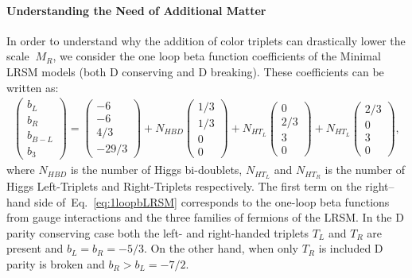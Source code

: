 \documentclass[11pt]{article}
\newcommand{\MR}{\:M_{R}}
\newcommand{\eq}[1]{Eq.~\eqref{#1}}
\def\bea{\begin{eqnarray} }
\def\eea{ \end{eqnarray} }
\begin{document}
\paragraph{Understanding the Need of Additional Matter}
In order to understand why the addition of color triplets can drastically lower the scale $\MR$, we consider the one loop beta function coefficients of the Minimal LRSM models (both D conserving and D breaking). These coefficients can be written as:
%
\bea
\label{eq:1loopbLRSM}
\left(
\begin{array}{c}
b_L\\
b_R\\
b_{B-L}\\
b_3
\end{array}\right)= 
\left(
\begin{array}{c}
-6\\ 
-6 \\ 
4/3\\
-29/3
\end{array}\right)+ N_{HBD} \left(
\begin{array}{c}
1/3\\ 
1/3 \\ 
0\\
0
\end{array}
\right) +
N_{H T_L} \left(
\begin{array}{c}
0\\ 
2/3 \\ 
3\\
0
\end{array}
\right)
+
N_{H T_L} \left(
\begin{array}{c}
2/3\\ 
0\\ 
3\\
0
\end{array}
\right)\!,
\eea
where $N_{HBD}$ is the number of Higgs bi-doublets, $N_{H T_L}$ and $N_{H T_R}$ is the number of Higgs Left-Triplets and Right-Triplets respectively. The first term on the right--hand side of~\eq{eq:1loopbLRSM} corresponds to the one-loop beta functions from gauge interactions and the three families of fermions of the LRSM. In the D parity conserving case both the left- and right-handed triplets $T_L$ and $T_R$ are present and $b_L=b_R=-5/3$. On the other hand, when only $T_R$ is included D parity is broken and $b_R> b_L=-7/2$. 
\end{document}
